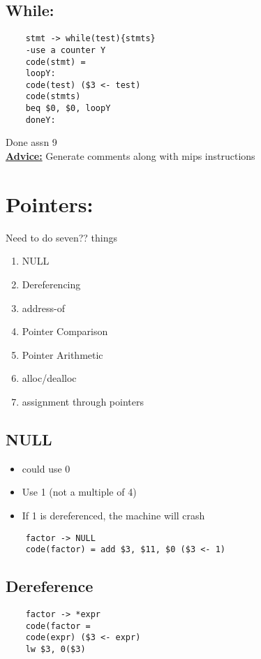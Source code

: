 \documentclass[12pt]{article}
\newcommand{\myt}[1]{\textbf{\underline{#1}}}
\begin{document}
	\subsection*{While:}
	\begin{verbatim}
	stmt -> while(test){stmts}
	-use a counter Y
	code(stmt) =
	loopY:
	code(test) ($3 <- test)
	code(stmts)
	beq $0, $0, loopY
	doneY: 
	\end{verbatim}

	Done assn 9\\
	
	\myt{Advice:} Generate comments along with mips instructions
	
	\section*{Pointers:}
	Need to do seven?? things\\
	\begin{enumerate}
		\item NULL
		\item Dereferencing
		\item address-of
		\item Pointer Comparison
		\item Pointer Arithmetic
		\item alloc/dealloc
		\item assignment through pointers
	\end{enumerate}	
	
	\subsection*{NULL}
	\begin{itemize}
		\item could use 0
		\item Use 1 (not a multiple of 4)
		\item If 1 is dereferenced, the machine will crash
	\end{itemize}
	
	\begin{verbatim}
	factor -> NULL
	code(factor) = add $3, $11, $0 ($3 <- 1)
	\end{verbatim}
	
	\subsection*{Dereference}
	\begin{verbatim}
	factor -> *expr
	code(factor = 
	code(expr) ($3 <- expr)
	lw $3, 0($3)
	\end{verbatim}
	
\end{document}
